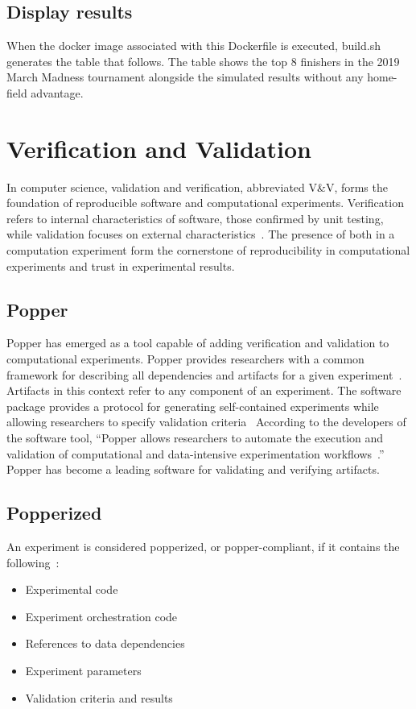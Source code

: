 \documentclass{IEEEtran}
\begin{document}
\subsection{Display results}
When the docker image associated with this Dockerfile is executed, build.sh generates the table that follows. The table shows the top 8 finishers in the 2019 March Madness tournament alongside the simulated results without any home-field advantage.




\section{Verification and Validation}
In computer science, validation and verification, abbreviated V\&V, forms the foundation of reproducible software and computational experiments. Verification refers to internal characteristics of software, those confirmed by unit testing, while validation focuses on external characteristics~\cite{heroux_2018}. The presence of both in a computation experiment form the cornerstone of reproducibility in computational experiments and trust in experimental results.

\subsection{Popper}

Popper has emerged as a tool capable of adding verification and validation to computational experiments. Popper provides researchers with a common framework for describing all dependencies and artifacts for a given experiment~\cite{TPC}. Artifacts in this context refer to any component of an experiment. The software package provides a protocol for generating self-contained experiments while allowing researchers to specify validation criteria~\cite{TPC} According to the developers of the software tool, “Popper allows researchers to automate the execution and validation of computational and data-intensive experimentation workflows~\cite{popperWeb}.” Popper has become a leading software for validating and verifying artifacts.

\subsection{Popperized}

An experiment is considered popperized, or popper-compliant, if it contains the following~\cite{TPC}: 
\begin{itemize}
  \item Experimental code
  \item Experiment orchestration code
  \item References to data dependencies
  \item Experiment parameters
  \item Validation criteria and results
\end{itemize}
\end{document}
